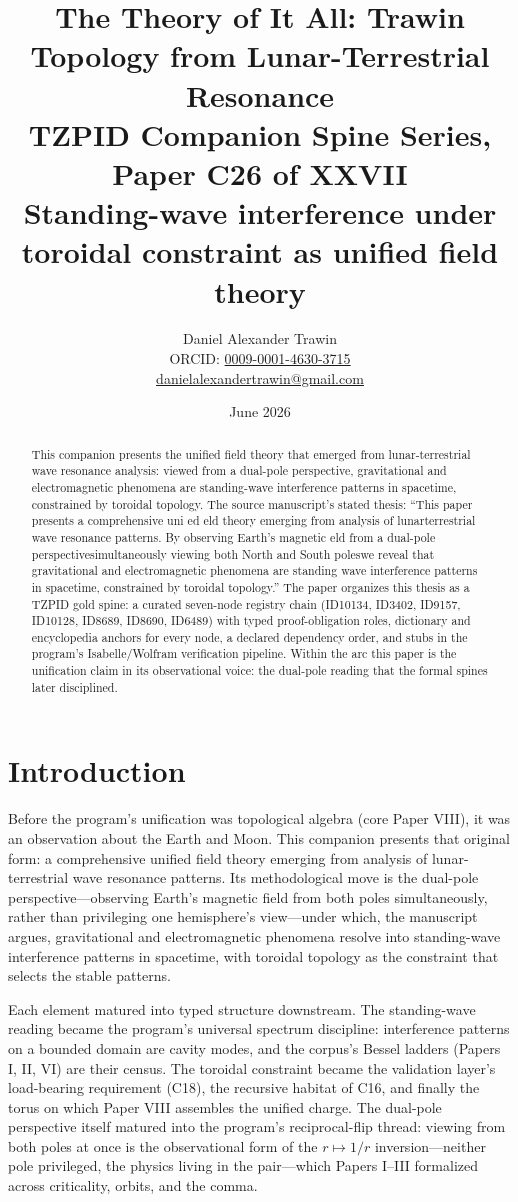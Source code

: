 \documentclass[11pt]{article}
\title{The Theory of It All: Trawin Topology from Lunar-Terrestrial Resonance\\[0.6em]
\large TZPID Companion Spine Series, Paper C26 of XXVII\\
\normalsize Standing-wave interference under toroidal constraint as unified field theory}
\author{Daniel Alexander Trawin\\
\small ORCID: \href{https://orcid.org/0009-0001-4630-3715}{0009-0001-4630-3715}\\
\small \href{mailto:danielalexandertrawin@gmail.com}{danielalexandertrawin@gmail.com}}
\date{June 2026}
\theoremstyle{remark}
\begin{document}
\maketitle

\begin{abstract}
This companion presents the unified field theory that emerged from lunar-terrestrial wave resonance analysis: viewed from a dual-pole perspective, gravitational and electromagnetic phenomena are standing-wave interference patterns in spacetime, constrained by toroidal topology.
The source manuscript's stated thesis: ``This paper presents a comprehensive uni ed eld theory emerging from analysis of lunarterrestrial wave resonance patterns. By observing Earth's magnetic eld from a dual-pole perspectivesimultaneously viewing both North and South poleswe reveal that gravitational and electromagnetic phenomena are standing wave interference patterns in spacetime, constrained by toroidal topology.'' The paper organizes this thesis as a TZPID gold spine: a curated seven-node registry chain (ID10134, ID3402, ID9157, ID10128, ID8689, ID8690, ID6489) with typed proof-obligation roles, dictionary and encyclopedia anchors for every node, a declared dependency order, and stubs in the program's Isabelle/Wolfram verification pipeline. Within the arc this paper is the unification claim in its observational voice: the dual-pole reading that the formal spines later disciplined.
\end{abstract}

\section{Introduction}
\label{sec:intro}

Before the program's unification was topological algebra (core Paper VIII), it was an observation about the Earth and Moon. This companion presents that original form: a comprehensive unified field theory emerging from analysis of lunar-terrestrial wave resonance patterns. Its methodological move is the dual-pole perspective---observing Earth's magnetic field from both poles simultaneously, rather than privileging one hemisphere's view---under which, the manuscript argues, gravitational and electromagnetic phenomena resolve into standing-wave interference patterns in spacetime, with toroidal topology as the constraint that selects the stable patterns.

Each element matured into typed structure downstream. The standing-wave reading became the program's universal spectrum discipline: interference patterns on a bounded domain are cavity modes, and the corpus's Bessel ladders (Papers I, II, VI) are their census. The toroidal constraint became the validation layer's load-bearing requirement (C18), the recursive habitat of C16, and finally the torus on which Paper VIII assembles the unified charge. The dual-pole perspective itself matured into the program's reciprocal-flip thread: viewing from both poles at once is the observational form of the $r \mapsto 1/r$ inversion---neither pole privileged, the physics living in the pair---which Papers I--III formalized across criticality, orbits, and the comma.
\end{document}
